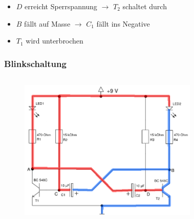 \begin{frame}
\begin{columns}[c]
\begin{figure}[H]
\begin{center}
    \end{center}
    \end{figure}
    \end{columns}
    \begin{block}{}
         \begin{itemize}
            \item $D$ erreicht Sperrspannung $\rightarrow$ $T_2$ schaltet durch
            \item $B$ fällt auf Masse $\rightarrow$ $C_1$ fällt ins Negative
            \item $T_1$ wird unterbrochen
         \end{itemize}
    \end{block}
\end{frame}
\begin{frame}
    \frametitle{Blinkschaltung}
    \begin{columns}[c]
        \begin{figure}[H]
        \begin{center}
                \includegraphics[scale=0.25]{./img/schaltungen/blink_4.png}
        \end{center}
        \end{figure}
    \begin{figure}[H]
    \begin{center}

\end{center}
\end{figure}
\end{columns}
\end{frame}
